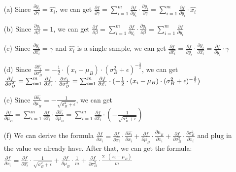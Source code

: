\documentclass{article}
\begin{document}
\begin{itemize}
    \item[(a)] Since $\frac{\partial y_i}{\partial \gamma} = \hat{x_i}$, we can get $\frac{\partial f}{\partial \gamma} = \sum_{i=1}^{m} \frac{\partial f}{\partial y_i} \cdot \frac{\partial y_i}{\partial \gamma} = \sum_{i=1}^{m} \frac{\partial f}{\partial y_i} \cdot \hat{x_i}$ 
    
    \item[(b)] Since $\frac{\partial y_i}{\partial \beta} = 1$, we can get $\frac{\partial f}{\partial \beta} = \sum_{i=1}^{m} \frac{\partial f}{\partial y_i} \cdot \frac{\partial y_i}{\partial \beta} = \sum_{i=1}^{m} \frac{\partial f}{\partial y_i}$
    
    \item[(c)] Since $\frac{\partial y_i}{\partial \hat{x_i}} = \gamma $ and $\hat{x_i}$ is a single sample, we can get $\frac{\partial f}{\partial \hat{x_i}} = \frac{\partial f}{\partial y_i} \cdot \frac{\partial y_i}{\partial \hat{x_i}} = \frac{\partial f}{\partial y_i} \cdot \gamma$
    
    \item[(d)] Since $\frac{\partial \hat{x_i}}{\partial \sigma_B ^2} = -\frac{1}{2} \cdot (x_i - \mu_B) \cdot (\sigma_B^2 + \epsilon)^{-\frac{3}{2}}$, we can get $\frac{\partial f}{\partial \sigma_B ^2} = \sum_{i=1}^{m} \frac{\partial f}{\partial \hat{x_i}} \cdot \frac{\partial \hat{x_i}}{\partial{\sigma_B ^2}} \\ =\sum_{i=1}^{m} \frac{\partial f}{\partial \hat{x_i}} \cdot (-\frac{1}{2} \cdot (x_i - \mu_B) \cdot (\sigma_B^2 + \epsilon)^{-\frac{3}{2}}) $
    
    \item[(e)] Since $\frac{\partial \hat{x_i}}{\partial \mu_B} = -\frac{1}{\sqrt{\sigma_B^2 + \epsilon}}$, we can get $\frac{\partial f}{\partial \mu_B} = \sum_{i=1}^{m} \frac{\partial f}{\partial \hat{x_i}} \cdot \frac{\partial \hat{x_i}}{\partial{\mu_B}} = \sum_{i=1}^{m} \frac{\partial f}{\partial \hat{x_i}} \cdot (-\frac{1}{\sqrt{\sigma_B^2 + \epsilon}})$

    \item[(f)] We can derive the formula $\frac{\partial f}{\partial x_i} = \frac{\partial f}{\partial \hat{x_i}} \cdot \frac{\partial \hat{x_i}}{\partial x_i} + \frac{\partial f}{\partial \mu_B} \cdot \frac{\partial \mu_B}{\partial x_i} + \frac{\partial f}{\partial \sigma_B^2} \cdot \frac{\partial \sigma_B^2}{\partial x_i}$ and plug in the value we already have. After that, we can get the formula: \\ $\frac{\partial f}{\partial x_i} = \frac{\partial f}{\partial \hat{x_i}} \cdot \frac{1}{\sqrt{\sigma_B^2+\epsilon}} + \frac{\partial f}{\partial \mu_B} \cdot \frac{1}{m} + \frac{\partial f}{\partial \sigma_B^2} \cdot \frac{2 \cdot (x_i - \mu_B)}{m}$

\end{itemize}
\end{document}
